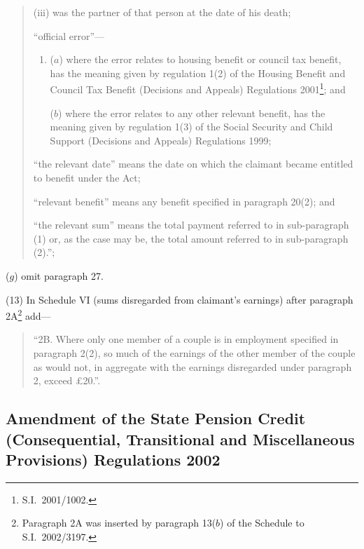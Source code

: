 \documentclass[12pt,a4paper]{article}
\begin{document}
\begin{enumerate}
\begin{quotation}
\begin{enumerate}
\begin{enumerate}
\begin{enumerate}
    (iii) 
    was the partner of that person at the date of his death;
\end{enumerate}
\end{enumerate}

    “official error”—
\begin{enumerate}\item[]
    ($a$) 
    where the error relates to housing benefit or council tax benefit, has the meaning given by regulation 1(2) of the Housing Benefit and Council Tax Benefit (Decisions and Appeals) Regulations 2001\footnote{S.I.\ 2001/1002.};
    and

    ($b$) 
    where the error relates to any other relevant benefit, has the meaning given by regulation 1(3) of the Social Security and Child Support (Decisions and Appeals) Regulations 1999;
\end{enumerate}

    “the relevant date” means the date on which the claimant became entitled to benefit under the Act;

    “relevant benefit” means any benefit specified in paragraph 20(2); and

    “the relevant sum” means the total payment referred to in sub-paragraph (1) or, as the case may be, the total amount referred to in sub-paragraph (2).”; 
\end{enumerate}
\end{quotation}

($g$) omit paragraph 27.
\end{enumerate}

(13) In Schedule VI (sums disregarded from claimant’s earnings) after paragraph 2A\footnote{Paragraph 2A was inserted by paragraph 13($b$) of the Schedule to S.I.\ 2002/3197.} add—
\begin{quotation}
“2B.  Where only one member of a couple is in employment specified in paragraph 2(2), so much of the earnings of the other member of the couple as would not, in aggregate with the earnings disregarded under paragraph 2, exceed £20.”.
\end{quotation}

\subsection[3. Amendment of the State Pension Credit (Consequential, Transitional and Miscellaneous Provisions) Regulations 2002]{Amendment of the State Pension Credit (Consequential, Transitional and Miscellaneous Provisions) Regulations 2002}
\end{document}
